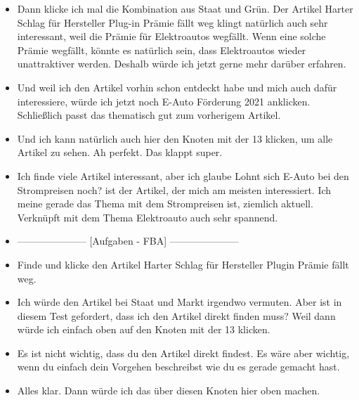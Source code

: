 {\begin{itemize}[]
              Natürlich klicke ich dann auch hier wieder auf Grün.
              \flqq Deutlich sauberer als gedacht\frqq{} klingt sehr positiv.
              Wenn ich jetzt interessiert daran wäre ein Elektroauto zu kaufen, dann fühle ich mich natürlich gut, wenn es sogar noch sauberer ist als gedacht.
        \item {} Dann klicke ich mal die Kombination aus Staat und Grün.
              Der Artikel \flqq Harter Schlag für Hersteller Plug-in Prämie fällt weg\frqq{} klingt natürlich auch sehr interessant, weil die Prämie für Elektroautos wegfällt.
              Wenn eine solche Prämie wegfällt, könnte es natürlich sein, dass Elektroautos wieder unattraktiver werden.
              Deshalb würde ich jetzt gerne mehr darüber erfahren.
        \item {} Und weil ich den Artikel vorhin schon entdeckt habe und mich auch dafür interessiere, würde ich jetzt noch \flqq E-Auto Förderung 2021\frqq{} anklicken.
              Schließlich passt das thematisch gut zum vorherigem Artikel.
        \item {} Und ich kann natürlich auch hier den Knoten mit der 13 klicken, um alle Artikel zu sehen.
              Ah perfekt. Das klappt super.
        \item {} Ich finde viele Artikel interessant, aber ich glaube \flqq Lohnt sich E-Auto bei den Strompreisen noch?\frqq{} ist der Artikel, der mich am meisten interessiert.
              Ich meine gerade das Thema mit dem Strompreisen ist, ziemlich aktuell.
              Verknüpft mit dem Thema Elektroauto auch sehr spannend.
        \item {---------------------} [Aufgaben - FBA] {---------------------}
        \item {} Finde und klicke den Artikel \flqq Harter Schlag für Hersteller Plugin Prämie fällt weg\frqq{}.
        \item {} Ich würde den Artikel bei Staat und Markt irgendwo vermuten.
              Aber ist in diesem Test gefordert, dass ich den Artikel direkt finden muss?
              Weil dann würde ich einfach oben auf den Knoten mit der 13 klicken.
        \item {} Es ist nicht wichtig, dass du den Artikel direkt findest.
              Es wäre aber wichtig, wenn du einfach dein Vorgehen beschreibst wie du es gerade gemacht hast.
        \item {} Alles klar. Dann würde ich das über diesen Knoten hier oben machen.

\end{itemize}}

